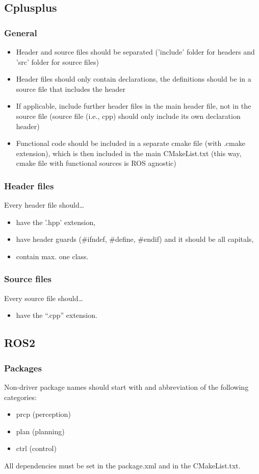 \documentclass[sn-mathphys-num]{sn-jnl}%
\begin{document}
\subsection{Cplusplus}
\subsubsection{General}
\begin{itemize}
    \item Header and source files should be separated ('include' folder for headers and 'src' folder for source files)
    \item Header files should only contain declarations, the definitions should be in a source file that includes the header
    \item If applicable, include further header files in the main header file, not in the source file (source file (i.e., cpp) should only include its own declaration header)
    \item Functional code should be included in a separate cmake file (with .cmake extension), which is then included in the main CMakeList.txt (this way, cmake file with functional sources is ROS agnostic)
\end{itemize}

\subsubsection{Header files}
Every header file should…
\begin{itemize}
    \item have the '.hpp' extension,
    \item have header guards (\#ifndef, \#define, \#endif) and it should be all capitals,
    \item contain max. one class.
\end{itemize}

\subsubsection{Source files}
Every source file should…
\begin{itemize}
    \item have the “.cpp” extension.
\end{itemize}

\subsection{ROS2}
\subsubsection{Packages}
Non-driver package names should start with and abbreviation of the following categories:
\begin{itemize}
    \item prcp (perception)
    \item plan (planning)
    \item ctrl (control)
\end{itemize}
All dependencies must be set in the package.xml and in the CMakeList.txt.
\end{document}
